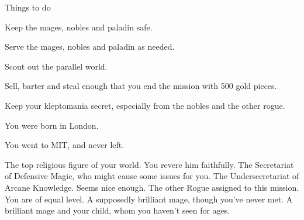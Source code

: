 \documentclass[char]{guildcamp3}
\begin{document}
\begin{itemz}[Goals]
  \item Things to do
  \item Keep the mages, nobles and paladin safe.
  \item Serve the mages, nobles and paladin as needed.
  \item Scout out the parallel world.
  \item Sell, barter and steal enough that you end the mission with 500 gold pieces.
  \item Keep your kleptomania secret, especially from the nobles and the other rogue.  
\end{itemz}

\begin{itemz}[Notes]
  \item You were born in London.
  \item You went to MIT, and never left.
\end{itemz}


\begin{contacts}
	\contact{\cPaladin{}} The top religious figure of your world. You revere him faithfully.
	\contact{\cNobleOne{}} The Secretariat of Defensive Magic, who might cause some issues for you.
	\contact{\cNobleTwo{}} The Undersecretariat of Arcane Knowledge. Seems nice enough.
	\contact{\cRogueOne{}} The other Rogue assigned to this mission. You are of equal level.
	\contact{\cMageOne{}} A supposedly brilliant mage, though you've never met.
    \contact{\cMageTwo{}} A brilliant mage and your child, whom you haven't seen for ages.
\end{contacts}



  \mTest{}
\end{document}
